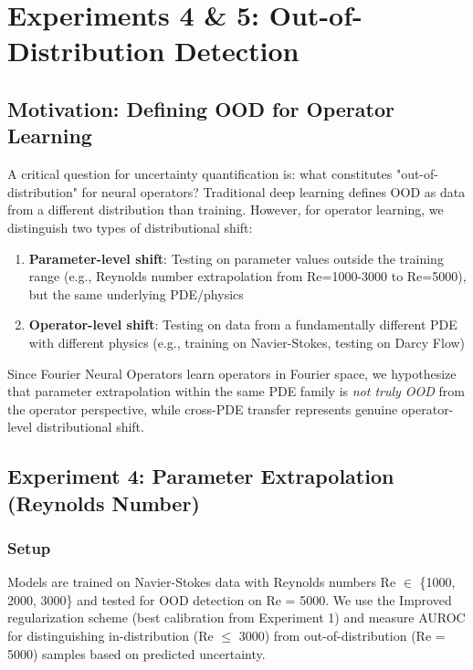 \section{Experiments 4 \& 5: Out-of-Distribution Detection}

\subsection{Motivation: Defining OOD for Operator Learning}

A critical question for uncertainty quantification is: what constitutes "out-of-distribution" for neural operators? Traditional deep learning defines OOD as data from a different distribution than training. However, for operator learning, we distinguish two types of distributional shift:

\begin{enumerate}
\item \textbf{Parameter-level shift}: Testing on parameter values outside the training range (e.g., Reynolds number extrapolation from Re=1000-3000 to Re=5000), but the same underlying PDE/physics
\item \textbf{Operator-level shift}: Testing on data from a fundamentally different PDE with different physics (e.g., training on Navier-Stokes, testing on Darcy Flow)
\end{enumerate}

Since Fourier Neural Operators learn operators in Fourier space, we hypothesize that parameter extrapolation within the same PDE family is \textit{not truly OOD} from the operator perspective, while cross-PDE transfer represents genuine operator-level distributional shift.

\subsection{Experiment 4: Parameter Extrapolation (Reynolds Number)}

\subsubsection{Setup}

Models are trained on Navier-Stokes data with Reynolds numbers Re $\in$ \{1000, 2000, 3000\} and tested for OOD detection on Re = 5000. We use the Improved regularization scheme (best calibration from Experiment 1) and measure AUROC for distinguishing in-distribution (Re $\leq$ 3000) from out-of-distribution (Re = 5000) samples based on predicted uncertainty.

